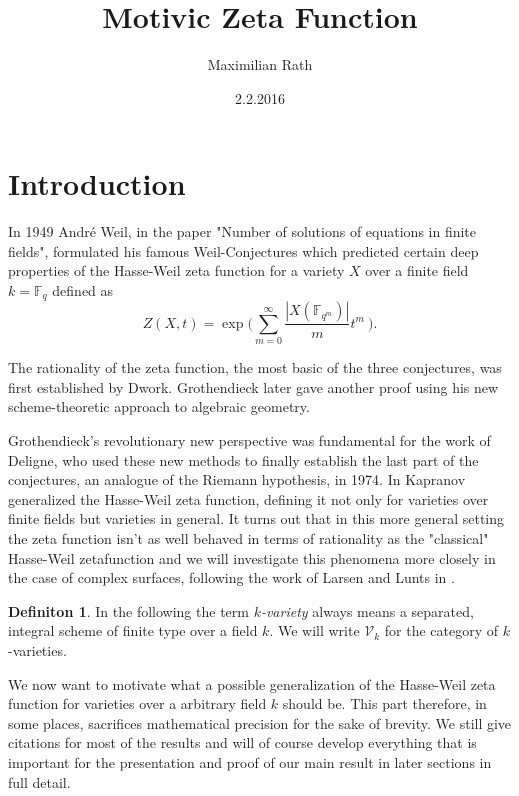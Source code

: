 \documentclass[11pt, a4paper, german]{article}
\author{Maximilian Rath}
\date{2.2.2016}
\title{Motivic Zeta Function}
\theoremstyle{plain}
\newtheorem{theorem}{Theorem}
\theoremstyle{definition}
\newtheorem{definition}[theorem]{Definiton}
\begin{document}
\maketitle
\section{Introduction}

In 1949 Andr\'e Weil, in the paper "Number of solutions of equations in finite fields", formulated his famous Weil-Conjectures
which predicted certain deep properties of the Hasse-Weil zeta function for a variety $X$ over a finite field $k = \mathbb{F}_q$ defined as
\[
    Z(X,t) = \exp \big(\sum_{m=0}^\infty \frac{|X(\mathbb{F}_{q^m})|}{m} t^m \ \big).
\]

The rationality of the zeta function, the most basic of the three conjectures, was first established by Dwork. Grothendieck later gave another
proof using his new scheme-theoretic approach to algebraic geometry. 


Grothendieck's revolutionary new perspective was fundamental for the work of Deligne, who used these new methods to finally establish the 
last part of the conjectures, an analogue of the Riemann hypothesis, in 1974.
In \cite{kapranov} Kapranov generalized the Hasse-Weil zeta function, defining it not only for varieties over finite fields
but varieties in general. It turns out that in this more general setting the zeta function isn't as well behaved in terms of rationality as
the "classical" Hasse-Weil zetafunction and we will investigate this phenomena more closely in the case of complex surfaces, following the 
work of Larsen and Lunts in \cite{MR1996804}.

\begin{definition}
    In the following the term \emph{$k$-variety} always means a separated, integral scheme of finite type over a field $k$.
    We will write $\mathcal{V}_k$ for the category of $k$-varieties.
\end{definition}

We now want to motivate what a possible generalization of the Hasse-Weil zeta function for varieties over a arbitrary field $k$ should be.
This part therefore, in some places, sacrifices mathematical precision for the sake of brevity.  
We still give citations for most of the results and will of course develop everything that is important for the presentation and proof 
of our main result in later sections in full detail.
\end{document}
